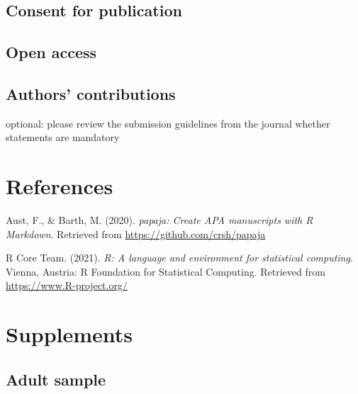 \documentclass[
  english,
  man,floatsintext]{apa6}
\newlength{\cslhangindent}
\newlength{\cslentryspacingunit} %
\newenvironment{CSLReferences}[2] %
 {%
  \setlength{\parindent}{0pt}
  \ifodd #1
  \let\oldpar\par
  \def\par{\hangindent=\cslhangindent\oldpar}
  \fi
  \setlength{\parskip}{#2\cslentryspacingunit}
 }%
 {}
\begin{document}
\hypertarget{consent-for-publication}{%
\subsection{Consent for publication}\label{consent-for-publication}}

\hypertarget{open-access}{%
\subsection{Open access}\label{open-access}}

\hypertarget{authors-contributions}{%
\subsection{Authors' contributions}\label{authors-contributions}}

optional: please review the submission guidelines from the journal whether statements are mandatory

\newpage

\hypertarget{references}{%
\section{References}\label{references}}

\begingroup
\setlength{\parindent}{-0.5in}
\setlength{\leftskip}{0.5in}

\hypertarget{refs}{}
\begin{CSLReferences}{1}{0}
\leavevmode{}%
Aust, F., \& Barth, M. (2020). \emph{{papaja}: {Create} {APA} manuscripts with {R Markdown}}. Retrieved from \url{https://github.com/crsh/papaja}

\leavevmode{}%
R Core Team. (2021). \emph{R: A language and environment for statistical computing}. Vienna, Austria: R Foundation for Statistical Computing. Retrieved from \url{https://www.R-project.org/}

\end{CSLReferences}

\endgroup

\newpage

\hypertarget{supplements}{%
\section{Supplements}\label{supplements}}

\hypertarget{adult-sample}{%
\subsection{Adult sample}\label{adult-sample}}
\end{document}
